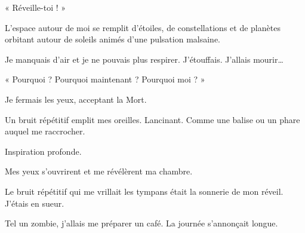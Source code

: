 « Réveille-toi ! »

L'espace autour de moi se remplit d'étoiles, de constellations et de planètes orbitant autour de soleils animés d'une 
pulsation malsaine.

Je manquais d'air et je ne pouvais plus respirer. J'étouffais. J'allais mourir…

« Pourquoi ? Pourquoi maintenant ? Pourquoi moi ? »

Je fermais les yeux, acceptant la Mort.

Un bruit répétitif emplit mes oreilles. Lancinant. Comme une balise ou un phare auquel me raccrocher.

Inspiration profonde.

Mes yeux s'ouvrirent et me révélèrent ma chambre.

Le bruit répétitif qui me vrillait les tympans était la sonnerie de mon réveil. J'étais en sueur.

Tel un zombie, j'allais me préparer un café. La journée s'annonçait longue.
